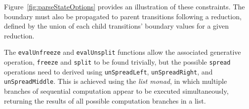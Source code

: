 \documentclass[12pt,a4paper,twoside,openright]{report}
\theoremstyle{definition}
\begin{document}
  Figure~\ref{fig:parseStateOptions} provides an illustration of these constraints. The boundary must also be propagated to parent transitions following a reduction, defined by the union of each child transitions' boundary values for a given reduction.



The \texttt{evalUnfreeze} and \texttt{evalUnsplit} functions allow the associated generative operation, \texttt{freeze} and \texttt{split} to be found trivially, but the possible \texttt{spread} operations need to derived using \texttt{unSpreadLeft}, \texttt{unSpreadRight}, and \texttt{unSpreadMiddle}.
This is achieved using the \textit{list monad}, in which multiple branches of sequential computation appear to be executed simultaneously, returning the results of all possible computation branches in a list.
\end{document}
